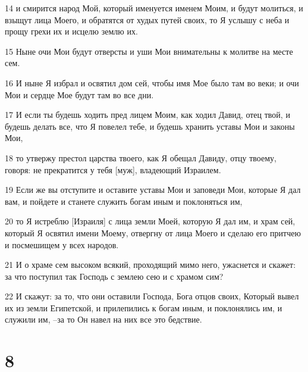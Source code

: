 \par 14 и смирится народ Мой, который именуется именем Моим, и будут молиться, и взыщут лица Моего, и обратятся от худых путей своих, то Я услышу с неба и прощу грехи их и исцелю землю их.
\par 15 Ныне очи Мои будут отверсты и уши Мои внимательны к молитве на месте сем.
\par 16 И ныне Я избрал и освятил дом сей, чтобы имя Мое было там во веки; и очи Мои и сердце Мое будут там во все дни.
\par 17 И если ты будешь ходить пред лицем Моим, как ходил Давид, отец твой, и будешь делать все, что Я повелел тебе, и будешь хранить уставы Мои и законы Мои,
\par 18 то утвержу престол царства твоего, как Я обещал Давиду, отцу твоему, говоря: не прекратится у тебя [муж], владеющий Израилем.
\par 19 Если же вы отступите и оставите уставы Мои и заповеди Мои, которые Я дал вам, и пойдете и станете служить богам иным и поклоняться им,
\par 20 то Я истреблю [Израиля] с лица земли Моей, которую Я дал им, и храм сей, который Я освятил имени Моему, отвергну от лица Моего и сделаю его притчею и посмешищем у всех народов.
\par 21 И о храме сем высоком всякий, проходящий мимо него, ужаснется и скажет: за что поступил так Господь с землею сею и с храмом сим?
\par 22 И скажут: за то, что они оставили Господа, Бога отцов своих, Который вывел их из земли Египетской, и прилепились к богам иным, и поклонялись им, и служили им, --за то Он навел на них все это бедствие.

\chapter{8}

